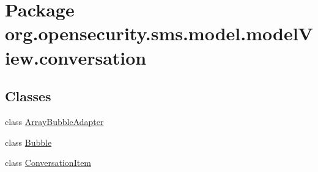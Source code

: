 \hypertarget{a00037}{\section{Package org.\+opensecurity.\+sms.\+model.\+model\+View.\+conversation}
\label{a00037}
}
\subsection*{Classes}
\begin{DoxyCompactItemize}
\item 
class \hyperlink{a00002}{Array\+Bubble\+Adapter}
\item 
class \hyperlink{a00004}{Bubble}
\item 
class \hyperlink{a00008}{Conversation\+Item}
\end{DoxyCompactItemize}
